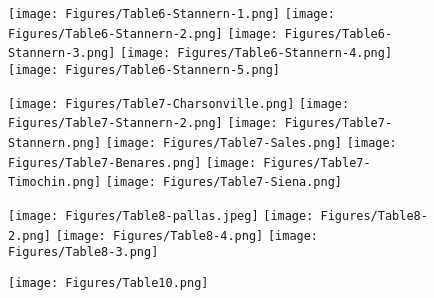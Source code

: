 \documentclass[a4paper, 11pt, oneside, german]{article}
\begin{document}
\clearpage
{}
\cfoot{\swabfamily{\thepage}}
\begin{figure}[p]
\texttt{[image: Figures/Table6-Stannern-1.png]}
\texttt{[image: Figures/Table6-Stannern-2.png]}
\texttt{[image: Figures/Table6-Stannern-3.png]}
\texttt{[image: Figures/Table6-Stannern-4.png]}
\texttt{[image: Figures/Table6-Stannern-5.png]}
\end{figure}
\clearpage
{}
\cfoot{\swabfamily{\thepage}}
\begin{figure}[p]
\texttt{[image: Figures/Table7-Charsonville.png]}
\texttt{[image: Figures/Table7-Stannern-2.png]}
\texttt{[image: Figures/Table7-Stannern.png]}
\texttt{[image: Figures/Table7-Sales.png]}
\texttt{[image: Figures/Table7-Benares.png]}
\texttt{[image: Figures/Table7-Timochin.png]}
\texttt{[image: Figures/Table7-Siena.png]}
\end{figure}
\clearpage
{}
\cfoot{\swabfamily{\thepage}}
\begin{figure}[p]
\texttt{[image: Figures/Table8-pallas.jpeg]}
\texttt{[image: Figures/Table8-2.png]}
\texttt{[image: Figures/Table8-4.png]}
\texttt{[image: Figures/Table8-3.png]}
\end{figure}
\clearpage
{}
\cfoot{\swabfamily{\thepage}}
\begin{figure}[p]
\texttt{[image: Figures/Table10.png]}
\end{figure}
\clearpage
\end{document}
